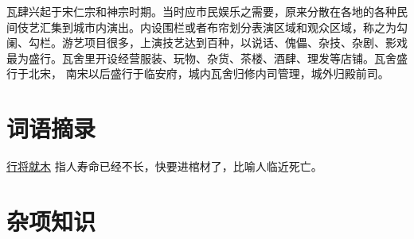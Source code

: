 \documentclass[UTF8,oneside]{ctexbook}
\begin{document}
瓦肆兴起于宋仁宗和神宗时期。当时应市民娱乐之需要，原来分散在各地的各种民间伎艺汇集到城市内演出。内设围栏或者布帘划分表演区域和观众区域，称之为勾阑、勾栏。游艺项目很多，上演技艺达到百种，以说话、傀儡、杂技、杂剧、影戏最为盛行。瓦舍里开设经营服装、玩物、杂货、茶楼、酒肆、理发等店铺。瓦舍盛行于北宋，
南宋以后盛行于临安府，城内瓦舍归修内司管理，城外归殿前司。

\section{词语摘录}
\mfApache \quad \underline{行将就木} \quad 
指人寿命已经不长，快要进棺材了，比喻人临近死亡。

\mfApache \quad 

\section{杂项知识}
\end{document}
